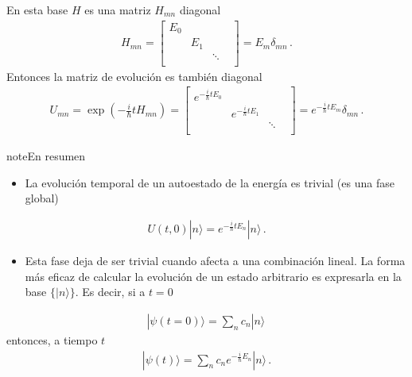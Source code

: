\documentclass[letterpaper,10pt,english]{jupyterBook}
\newcommand{\ket}[1]{|#1\rangle}
\begin{document}
\sphinxAtStartPar
En esta base \(H\) es una matriz \(H_{mn}\) diagonal
\begin{equation*}
\begin{split}
H_{mn} =  \begin{bmatrix} E_0 &  & & \\  & E_1 &  & \\ & & \ddots & \\ & & & \end{bmatrix} =E_m \delta_{mn} \, .
\end{split}
\end{equation*}
\sphinxAtStartPar
Entonces la matriz de evolución es también diagonal
\begin{equation*}
\begin{split}
U_{mn} = \exp\left(-\frac{i}{\hbar}t H_{mn}\right) = 
 \begin{bmatrix} e^{-\frac{i}{\hbar}t E_0} &  & & \\  & e^{-\frac{i}{\hbar} t E_1}  &  & \\ & & \ddots & \\ & & & \end{bmatrix} = e^{-\frac{i}{\hbar} t  E_m }\delta_{mn} \, .
\end{split}
\end{equation*}
\begin{sphinxadmonition}{note}{En resumen}
\begin{itemize}
\item {} 
\sphinxAtStartPar
La evolución temporal de un autoestado de la energía es trivial (es una fase global)

\end{itemize}
\begin{equation*}
\begin{split}
U(t,0)\ket{n} = e^{-\frac{i}{\hbar} t E_n} \ket{n}\, .
\end{split}
\end{equation*}\begin{itemize}
\item {} 
\sphinxAtStartPar
Esta fase deja de ser trivial cuando afecta a una combinación lineal. La forma más eficaz de calcular la evolución de un estado arbitrario es expresarla en la base \(\{\ket{n}\}\).
Es decir, si a \(t=0\)

\end{itemize}
\begin{equation*}
\begin{split}
\ket{\psi(t=0)} = \sum_n c_n \ket{n} \, 
\end{split}
\end{equation*}
\sphinxAtStartPar
entonces, a tiempo \(t\)
\begin{equation*}
\begin{split}
\ket{\psi(t)} = \sum_n c_n e^{-\frac{i}{\hbar}E_n} \ket{n} \, .
\end{split}
\end{equation*}\end{sphinxadmonition}







\renewcommand{\indexname}{Index}
\printindex
\end{document}
